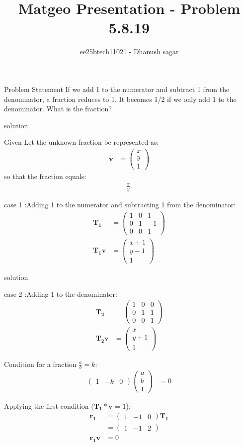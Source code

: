 \documentclass{beamer}
\title{Matgeo Presentation - Problem 5.8.19}
\author{ee25btech11021 - Dhanush sagar}
\numberwithin{equation}{section}
\theoremstyle{remark}
\newcommand{\myvec}[1]{\ensuremath{\begin{pmatrix}#1\end{pmatrix}}}
\let\vec\mathbf
\begin{document}
	

		




\begin{frame}
  \titlepage
\end{frame}

\begin{frame}{Problem Statement}
If we add 1 to the numerator and subtract 1 from the denominator, a fraction reduces
to 1. It becomes 1/2 if we only add 1 to the denominator. What is the fraction?
\end{frame}

\begin{frame}{solution}

Given
Let the unknown fraction be represented as:
\begin{align}
\vec{v} &= \myvec{x \\ y \\ 1}
\end{align}
so that the fraction equals:
\begin{align}
\frac{x}{y}.
\end{align}

case 1 :Adding 1 to the numerator and subtracting 1 from the denominator:
\begin{align}
\vec{T_1} &= \myvec{1 & 0 & 1 \\ 0 & 1 & -1 \\ 0 & 0 & 1} \\
\vec{T_1} \vec{v} &= \myvec{x+1 \\ y-1 \\ 1}
\end{align}
\end{frame}
\begin{frame}{solution}

case 2 :Adding 1 to the denominator:
\begin{align}
\vec{\vec{T_2}} &= \myvec{1 & 0 & 0 \\ 0 & 1 & 1 \\ 0 & 0 & 1} \\
\vec{\vec{T_2}} \vec{v} &= \myvec{x \\ y+1 \\ 1}
\end{align}

Condition for a fraction $\frac{a}{b}=k$:
\begin{align}
\myvec{1 & -k & 0} \myvec{a \\ b \\ 1} &= 0
\end{align}

Applying the first condition ($\vec{T_1}*\vec{v}$ = 1):
\begin{align}
\vec{r_1} &= \myvec{1 & -1 & 0} \vec{T_1} \\
    &= \myvec{1 & -1 & 2} \\
\vec{r_1} \vec{v} &= 0
\end{align}
\end{frame}
\end{document}
